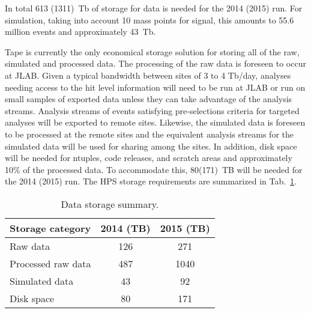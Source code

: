 In total 613 (1311)~Tb of storage for data is needed for the 2014 (2015) run. For simulation, taking 
into account 10 mass points for signal, this amounts to 55.6 million events and approximately 43~Tb.

Tape is currently the only economical storage
solution for storing all of the raw, simulated and processed data.
The processing of the raw data is foreseen to occur at JLAB. Given a
typical bandwidth between sites of 3 to 4 Tb/day, analyses needing
access to the hit level information will need to be run at JLAB or run
on small samples of exported data unless they can take advantage of the
analysis streams. Analysis streams of events satisfying
pre-selections criteria for targeted analyses will be exported to remote
sites. Likewise, the simulated data is foreseen to be processed at the
remote sites and the equivalent analysis streams for the simulated data
will be used for sharing among the sites. In addition, disk space will be 
needed for ntuples, code releases, and scratch areas and approximately 10\% of the 
processed data. To accommodate this, 80(171)~TB will be needed for the 2014 (2015) run. 
The HPS storage requirements are summarized in Tab.~\ref{tab:datastorage}.
\begin{table}[tbp]
\centering
\begin{tabular}{|l|c|c|}
\hline
Storage category & 2014 (TB) & 2015 (TB) \\
\hline
Raw data & 126 & 271 \\
Processed raw data & 487 & 1040 \\
Simulated data & 43 & 92 \\
Disk space  & 80  & 171 \\
\hline
\end{tabular}
\caption{{\small Data storage summary.}}
\label{tab:datastorage}
\end{table}


